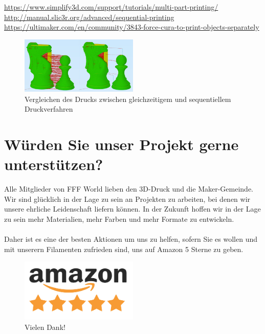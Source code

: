 \documentclass[11pt,a4paper]{article}
\begin{document}
\url{https://www.simplify3d.com/support/tutorials/multi-part-printing/}\\
\url{http://manual.slic3r.org/advanced/sequential-printing}\\
\url{https://ultimaker.com/en/community/3843-force-cura-to-print-objects-separately}
\begin{figure}[H]
\centering
\includegraphics[width=0.5\textwidth,cfbox=azul_marcos 4pt 0pt]{FOTOS/SEQUENTIALPRINTING}
\caption*{Vergleichen des Drucks zwischen gleichzeitigem und sequentiellem Druckverfahren}
\end{figure}
\section{Würden Sie unser Projekt gerne unterstützen?}
Alle Mitglieder von FFF World lieben den 3D-Druck und die Maker-Gemeinde. Wir sind glücklich in der Lage zu sein an Projekten zu arbeiten, bei denen wir unsere ehrliche Leidenschaft liefern können. In der Zukunft hoffen wir in der Lage zu sein mehr Materialien, mehr Farben und mehr Formate zu entwickeln.
\\\\
Daher ist es eine der besten Aktionen um uns zu helfen, sofern Sie es wollen und mit unserern Filamenten zufrieden sind, uns auf Amazon 5 Sterne zu geben.
\begin{figure}[H]
\centering
\includegraphics[width=0.5\textwidth,cfbox=azul_marcos 1pt 0pt]{FOTOS/AMAZON_FIVE_STARS}
\caption*{Vielen Dank!}
\end{figure}
\end{document}
